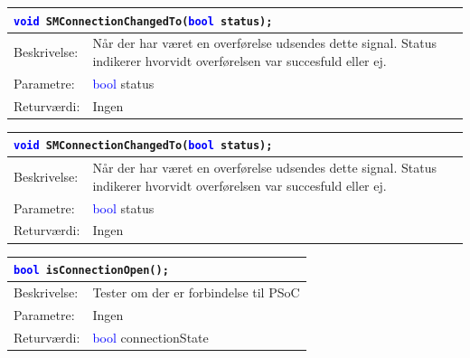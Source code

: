 \begin{table}[H]
\begin{tabular}{l p{12.5cm}}
\multicolumn{2}{l}{\texttt{\textcolor{blue}{void} SMConnectionChangedTo(\textcolor{blue}{bool} status);}} \\
\hline
Beskrivelse: &Når der har været en overførelse udsendes dette signal. Status indikerer hvorvidt overførelsen var succesfuld eller ej.\\
Parametre:&\textcolor{blue}{bool} status\\
Returværdi:&Ingen\\
\end{tabular}
\end{table}

\begin{table}[H]
\begin{tabular}{l p{12.5cm}}
\multicolumn{2}{l}{\texttt{\textcolor{blue}{void} SMConnectionChangedTo(\textcolor{blue}{bool} status);}} \\
\hline
Beskrivelse: &Når der har været en overførelse udsendes dette signal. Status indikerer hvorvidt overførelsen var succesfuld eller ej.\\
Parametre:&\textcolor{blue}{bool} status\\
Returværdi:&Ingen\\
\end{tabular}
\end{table}

\begin{table}[H]
\begin{tabular}{l p{12.5cm}}
\multicolumn{2}{l}{\texttt{\textcolor{blue}{bool} isConnectionOpen();}} \\
\hline
Beskrivelse: &Tester om der er forbindelse til PSoC\\
Parametre:&Ingen\\
Returværdi:&\textcolor{blue}{bool} connectionState\\
\end{tabular}
\end{table}